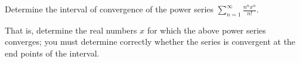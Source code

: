 Determine the interval of convergence of the power series
$\displaystyle{\sum_{n=1}^{\infty} \frac{n^n x^n}{n!}}$.

That is, determine the real numbers $x$ for which the above power series
converges; you must determine correctly whether the series is convergent at the
end points of the interval.
